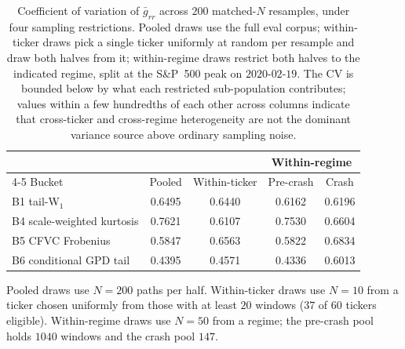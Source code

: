 
\begin{table}[t]
\centering
\caption{Coefficient of variation of $\bar{g}_{rr}$ across $200$ matched-$N$ resamples, under four sampling restrictions. Pooled draws use the full eval corpus; within-ticker draws pick a single ticker uniformly at random per resample and draw both halves from it; within-regime draws restrict both halves to the indicated regime, split at the S\&P~500 peak on $2020$-$02$-$19$. The CV is bounded below by what each restricted sub-population contributes; values within a few hundredths of each other across columns indicate that cross-ticker and cross-regime heterogeneity are not the dominant variance source above ordinary sampling noise.}
\label{tab:variance-decomposition}
\begin{tabular}{lcccc}
\toprule
                                      &        &               & \multicolumn{2}{c}{Within-regime} \\
\cmidrule(lr){4-5}
Bucket                                & Pooled & Within-ticker & Pre-crash & Crash \\
\midrule
B1 \enspace tail-W$_{1}$              & 0.6495 & 0.6440        & 0.6162    & 0.6196 \\
B4 \enspace scale-weighted kurtosis   & 0.7621 & 0.6107        & 0.7530    & 0.6604 \\
B5 \enspace CFVC Frobenius            & 0.5847 & 0.6563        & 0.5822    & 0.6834 \\
B6 \enspace conditional GPD tail      & 0.4395 & 0.4571        & 0.4336    & 0.6013 \\
\bottomrule
\end{tabular}

\medskip
\footnotesize
Pooled draws use $N{=}200$ paths per half. Within-ticker draws use $N{=}10$ from a ticker chosen uniformly from those with at least $20$ windows ($37$ of $60$ tickers eligible). Within-regime draws use $N{=}50$ from a regime; the pre-crash pool holds $1040$ windows and the crash pool $147$.
\end{table}
